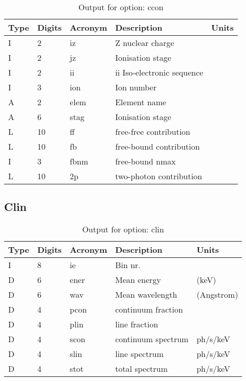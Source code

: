 \begin{table}[!p]
\caption{Output for option: ccon}
\label{tabout:ccon}
\begin{tabular}{lllll}
\hline
Type & Digits & Acronym & Description & Units \\ 
\hline
I &  2 & iz   & Z nuclear charge                 &                  \\
I &  2 & jz   & Ionisation stage                 &                  \\
I &  2 & ii   & ii Iso-electronic sequence       &                  \\
I &  3 & ion  & Ion number                       &                  \\
A &  2 & elem & Element name                     &                  \\
A &  6 & stag & Ionisation stage                 &                  \\
L & 10 & ff   & free-free contribution           &                  \\
L & 10 & fb   & free-bound contribution          &                  \\
I &  3 & fbnm & free-bound nmax                  &                  \\
L & 10 & 2p   & two-photon contribution          &                  \\
\hline
\end{tabular}
\end{table}

\subsection{Clin}

\begin{table}[!p]
\caption{Output for option: clin}
\label{tabout:clin}
\begin{tabular}{lllll}
\hline
Type & Digits & Acronym & Description & Units \\ 
\hline
I &  8 & ie   & Bin nr.                          &                  \\
D &  6 & ener & Mean energy                      & (keV)            \\
D &  6 & wav  & Mean wavelength                  & (Angstrom)       \\
D &  4 & pcon & continuum fraction               &                  \\
D &  4 & plin & line fraction                    &                  \\
D &  4 & scon & continuum spectrum               & ph/s/keV         \\
D &  4 & slin & line spectrum                    & ph/s/keV         \\
D &  4 & stot & total spectrum                   & ph/s/keV         \\
\hline
\end{tabular}
\end{table}

